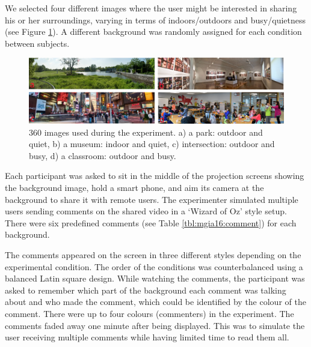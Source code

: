 We selected four different images where the user might be interested in sharing his or her surroundings, varying in terms of indoors/outdoors and busy/quietness (see Figure \ref{fig:mgia16:backgrounds}). A different background was randomly assigned for each condition between subjects. 

\begin{figure}[b]
  \centering
  \includegraphics[width=\linewidth]{images/mgia16/backgrounds-legend.png}
  \caption{360 images used during the experiment. a) a park: outdoor and quiet, b) a museum: indoor and quiet, c) intersection: outdoor and busy, d) a classroom: outdoor and busy.}
	\label{fig:mgia16:backgrounds}
\end{figure}

Each participant was asked to sit in the middle of the projection screens showing the background image, hold a smart phone, and aim its camera at the background to share it with remote users. The experimenter simulated multiple users sending comments on the shared video in a ‘Wizard of Oz' style setup. There were six predefined comments (see Table \ref{tbl:mgia16:comment}) for each background. 

The comments appeared on the screen in three different styles depending on the experimental condition. The order of the conditions was counterbalanced using a balanced Latin square design. While watching the comments, the participant was asked to remember which part of the background each comment was talking about and who made the comment, which could be identified by the colour of the comment. There were up to four colours (commenters) in the experiment. The comments faded away one minute after being displayed. This was to simulate the user receiving multiple comments while having limited time to read them all.

